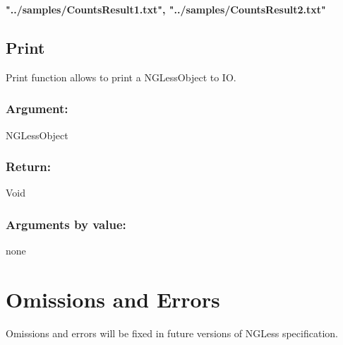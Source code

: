 \documentclass{article}
\begin{document}
\textbf{    "../samples/CountsResult1.txt", "../samples/CountsResult2.txt"  }


\subsection{Print}

Print function allows to print a NGLessObject to IO. 

\subsubsection*{Argument:}
NGLessObject

\subsubsection*{Return:}
Void

\subsubsection*{Arguments by value:}
none


\section{Omissions and Errors}

Omissions and errors will be fixed in future versions of NGLess specification.
\end{document}
